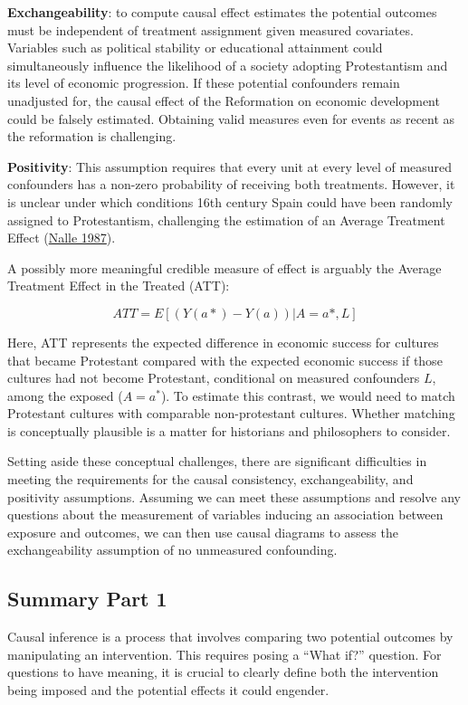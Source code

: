 \documentclass[
  singlecolumn]{report}
\begin{document}
\textbf{Exchangeability}: to compute causal effect estimates the
potential outcomes must be independent of treatment assignment given
measured covariates. Variables such as political stability or
educational attainment could simultaneously influence the likelihood of
a society adopting Protestantism and its level of economic progression.
If these potential confounders remain unadjusted for, the causal effect
of the Reformation on economic development could be falsely estimated.
Obtaining valid measures even for events as recent as the reformation is
challenging.

\textbf{Positivity}: This assumption requires that every unit at every
level of measured confounders has a non-zero probability of receiving
both treatments. However, it is unclear under which conditions 16th
century Spain could have been randomly assigned to Protestantism,
challenging the estimation of an Average Treatment Effect
(\protect\hyperlink{ref-nalle1987}{Nalle 1987}).

A possibly more meaningful credible measure of effect is arguably the
Average Treatment Effect in the Treated (ATT):

\[ATT = E[(Y(a*)- Y(a))|A = a*,L]\]

Here, ATT represents the expected difference in economic success for
cultures that became Protestant compared with the expected economic
success if those cultures had not become Protestant, conditional on
measured confounders \(L\), among the exposed (\(A = a^*\)). To estimate
this contrast, we would need to match Protestant cultures with
comparable non-protestant cultures. Whether matching is conceptually
plausible is a matter for historians and philosophers to consider.

Setting aside these conceptual challenges, there are significant
difficulties in meeting the requirements for the causal consistency,
exchangeability, and positivity assumptions. Assuming we can meet these
assumptions and resolve any questions about the measurement of variables
inducing an association between exposure and outcomes, we can then use
causal diagrams to assess the exchangeability assumption of no
unmeasured confounding.

\hypertarget{summary-part-1}{%
\subsection{Summary Part 1}\label{summary-part-1}}

Causal inference is a process that involves comparing two potential
outcomes by manipulating an intervention. This requires posing a ``What
if?'' question. For questions to have meaning, it is crucial to clearly
define both the intervention being imposed and the potential effects it
could engender.
\end{document}
